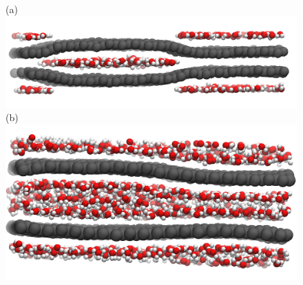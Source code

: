 \documentclass[12pt]{article}
\begin{document}
\begin{figure}[h!]
	\centering
	(a)~\includegraphics[width=0.99\linewidth]{d6L46_side} 
	(b)~\includegraphics[width=0.95\linewidth]{d12L46_side}
	\vspace{-10pt}
	\label{fig:chem_forms}
\end{figure}






\clearpage
\printbibliography
\end{document}
